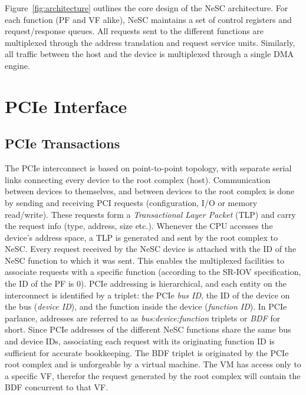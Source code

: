 Figure~\ref{fig:architecture} outlines the core design of the NeSC architecture. For each function (PF and VF alike), NeSC maintains a set of  control registers and request/response queues. All requests sent to the
different functions are multiplexed through the address translation and request service units. Similarly, all traffic between the host and the device is multiplexed through a single DMA engine. 

\section{PCIe Interface}
\label{arch:pcie}

\subsection*{PCIe Transactions}
\label{subsec:tlp}
The PCIe interconnect is based on point-to-point topology, with separate serial links connecting every device to the root complex (host).
Communication between devices to themselves, and between devices to the root complex is done by sending and receiving PCI requests (configuration, I/O or memory read/write). These requests form a \emph{Transactional Layer
  Packet} (TLP) and carry the request info (type, address, size etc.). Whenever the CPU accesses the device's address space, a TLP is generated and sent by the root complex to NeSC.  
Every request received by the NeSC device is attached with the ID of the NeSC function to which it was sent. This enables the multiplexed facilities to associate requests with a specific function (according to the SR-IOV specification, the ID of the PF is 0). PCIe addressing is hierarchical, and each entity on the interconnect is identified by a triplet: the PCIe \emph{bus ID}, the ID of the device on the bus (\emph{device ID}), and the function inside the device (\emph{function ID}). In PCIe parlance, addresses are referred to as \emph{bus:device:function} triplets or \emph{BDF} for short. Since PCIe addresses of the different NeSC functions share the same bus and device IDs, associating each request with its originating function ID is sufficient for accurate bookkeeping.
The BDF triplet is originated by the PCIe root complex and is unforgeable by a virtual machine. The VM has access only to a specific VF, therefor the request generated by the root complex  will contain the BDF concurrent to that VF.     

